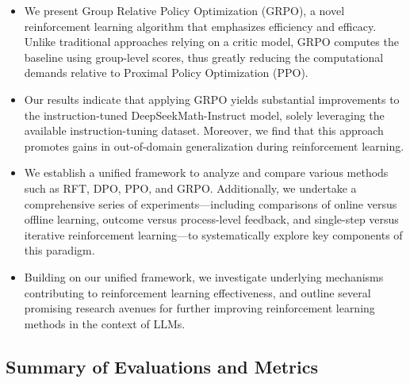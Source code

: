 \begin{itemize}[topsep=0pt]
    \item We present Group Relative Policy Optimization (GRPO), a novel reinforcement learning algorithm that emphasizes efficiency and efficacy. Unlike traditional approaches relying on a critic model, GRPO computes the baseline using group-level scores, thus greatly reducing the computational demands relative to Proximal Policy Optimization (PPO).
    \item Our results indicate that applying GRPO yields substantial improvements to the instruction-tuned DeepSeekMath-Instruct model, solely leveraging the available instruction-tuning dataset. Moreover, we find that this approach promotes gains in out-of-domain generalization during reinforcement learning.
    \item We establish a unified framework to analyze and compare various methods such as RFT, DPO, PPO, and GRPO. Additionally, we undertake a comprehensive series of experiments—including comparisons of online versus offline learning, outcome versus process-level feedback, and single-step versus iterative reinforcement learning—to systematically explore key components of this paradigm.
    \item Building on our unified framework, we investigate underlying mechanisms contributing to reinforcement learning effectiveness, and outline several promising research avenues for further improving reinforcement learning methods in the context of LLMs.
\end{itemize}

\subsection{Summary of Evaluations and Metrics}


